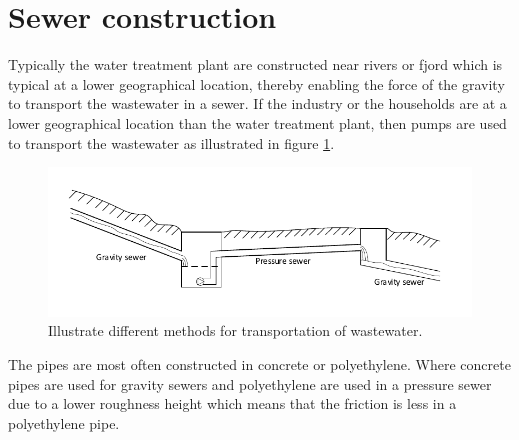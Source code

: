 \section{Sewer construction}\label{se:sewer_construction}
Typically the water treatment plant are constructed near rivers or fjord which is typical at a lower geographical location, thereby enabling the force of the gravity to transport the wastewater in a sewer. If the industry or the households are at a lower geographical location than the water treatment plant, then pumps are used to transport the wastewater as illustrated in figure \ref{fig:Sewer_drawing}.
\begin{figure}[H]
\centering
\includegraphics[width=1\textwidth]{report/introduction/pictures/Sewer_drawing.pdf}
\caption{Illustrate different methods for transportation of wastewater.}
\label{fig:Sewer_drawing}
\end{figure}

The pipes are most often constructed in concrete or polyethylene. Where concrete pipes are used for gravity sewers and polyethylene are used in a pressure sewer due to a lower roughness height which means that the friction is less in a polyethylene pipe. 